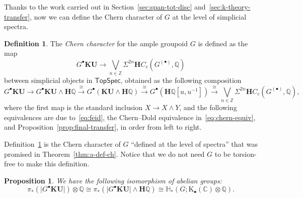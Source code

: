 \documentclass[a4paper,reqno]{amsart}
\theoremstyle{plain}
\newtheorem{proposition}[theorem]{Proposition}
\theoremstyle{definition}
\newtheorem{definition}[theorem]{Definition}
\theoremstyle{remark}
\numberwithin{equation}{section}
\newcommand{\rK}{\mathrm{K}}
\newcommand{\dC}{\mathbb{C}}
\newcommand{\dH}{\mathbb{H}}
\newcommand{\dQ}{\mathbb{Q}}
\newcommand{\dZ}{\mathbb{Z}}
\newcommand{\bH}{\mathbf{H}}
\newcommand{\TopSpec}{\mathsf{TopSpec}}
\newcommand{\gr}[1]{\lvert #1\rvert}
\newcommand{\KU}{\mathbf{KU}}
\begin{document}
Thanks to the work carried out in Section~\ref{sec:span-tot-disc} and~\ref{sec:k-theory-transfer}, now we can define the Chern character of $G$ at the level of simplicial spectra. 

\begin{definition}\label{def:mainch}
The \emph{Chern character} for the ample groupoid $G$ is defined as the map 
\[
G^{\bullet}\KU\to \bigvee_{n\in\dZ} \Sigma^{2n} \bH C_c(G^{(\bullet)},\dQ)
\]
between simplicial objects in $\TopSpec$, obtained as the following composition
\[
G^{\bullet}\KU\to G^{\bullet}\KU\wedge \bH\dQ \xrightarrow{\cong} G^{\bullet}(\KU\wedge \bH\dQ)\xrightarrow{\cong} G^{\bullet}(\bH\dQ[u,u^{-1}])\xrightarrow{\cong} \bigvee_{n\in\dZ} \Sigma^{2n} \bH C_c(G^{(\bullet)},\dQ),
\]
where the first map is the standard inclusion $X\to X\wedge Y$, and the following equivalences are due to~\eqref{eq:feid}, the Chern--Dold equivalence in~\eqref{eq:chern-equiv}, and Proposition~\ref{prop:final-transfer}, in order from left to right.
\end{definition}

Definition~\ref{def:mainch} is the Chern character of $G$ ``defined at the level of spectra'' that was promised in Theorem~\ref{thm:a-def-ch}.
Notice that we do not need $G$ to be torsion-free to make this definition.

\begin{proposition}\label{prop:s-hom}
We have the following isomorphism of abelian groups:
\[
\pi_*(\gr{G^{\bullet}\KU})\otimes \dQ \cong \pi_*(\gr{G^{\bullet}\KU}\wedge \bH\dQ)\cong \dH_*(G; \rK_\bullet(\dC)\otimes \dQ).
\]
\end{proposition}
\end{document}
